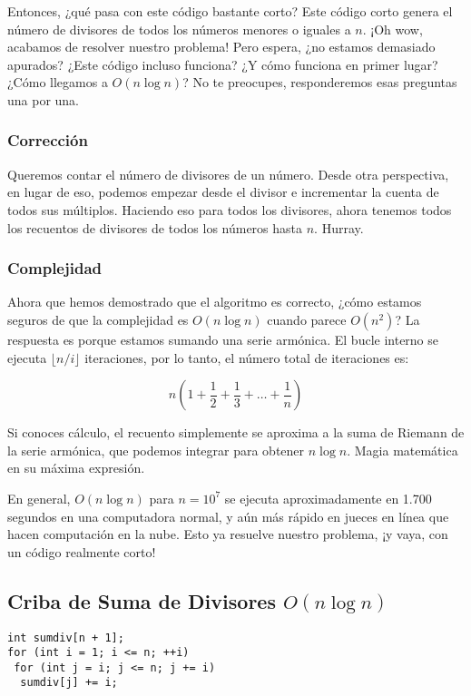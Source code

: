 \documentclass[11pt]{scrartcl}
\begin{document}
Entonces, ¿qué pasa con este código bastante corto? Este código corto genera el número de divisores de todos los números menores o iguales a \( n \). ¡Oh wow, acabamos de resolver nuestro problema! Pero espera, ¿no estamos demasiado apurados? ¿Este código incluso funciona? ¿Y cómo funciona en primer lugar? ¿Cómo llegamos a \( O(n \log n) \)? No te preocupes, responderemos esas preguntas una por una.

\subsubsection*{Corrección}

Queremos contar el número de divisores de un número. Desde otra perspectiva, en lugar de eso, podemos empezar desde el divisor e incrementar la cuenta de todos sus múltiplos. Haciendo eso para todos los divisores, ahora tenemos todos los recuentos de divisores de todos los números hasta \( n \). Hurray.

\subsubsection*{Complejidad}

Ahora que hemos demostrado que el algoritmo es correcto, ¿cómo estamos seguros de que la complejidad es \( O(n \log n) \) cuando parece \( O(n^2) \)? La respuesta es porque estamos sumando una serie armónica. El bucle interno se ejecuta \( \lfloor n / i \rfloor \) iteraciones, por lo tanto, el número total de iteraciones es:

\[
n \left(1 + \frac{1}{2} + \frac{1}{3} + \ldots + \frac{1}{n}\right)
\]

Si conoces cálculo, el recuento simplemente se aproxima a la suma de Riemann de la serie armónica, que podemos integrar para obtener \( n \log n \). Magia matemática en su máxima expresión.

En general, \( O(n \log n) \) para \( n = 10^7 \) se ejecuta aproximadamente en 1.700 segundos en una computadora normal, y aún más rápido en jueces en línea que hacen computación en la nube. Esto ya resuelve nuestro problema, ¡y vaya, con un código realmente corto!

\subsection*{Criba de Suma de Divisores \( O(n \log n) \)}

\begin{verbatim}
int sumdiv[n + 1];
for (int i = 1; i <= n; ++i)
 for (int j = i; j <= n; j += i)
  sumdiv[j] += i;
\end{verbatim}
\end{document}
